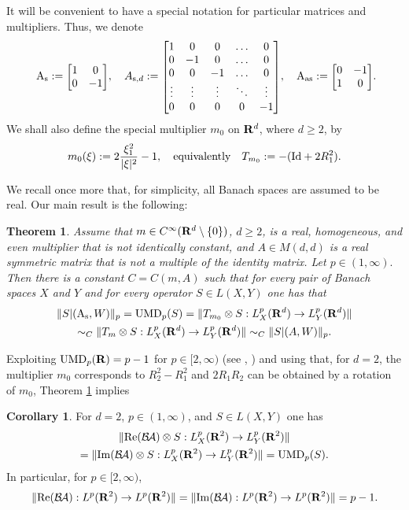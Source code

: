 \documentclass[11pt,a4paper,twoside,draft]{amsart}
\theoremstyle{definition}
\newtheorem{theorem}[lemma]{Theorem}
\newtheorem{corollary}[lemma]{Corollary}
\newcommand{\thm}[1]{\begin{theorem}\label{#1}\sl }
\newcommand{\ethm}{\end{theorem}}
\newcommand{\real}{{\bf R}}
\newcommand{\smooth}{C^\infty}
\newcommand{\BMATRIX}[1]{\begin{bmatrix}#1\end{bmatrix}}
\DeclareMathOperator{\ba}{{\mathcal B\!\mathcal A}}
\DeclareMathOperator{\umd}{{\rm UMD}}
\DeclareMathOperator{\bsym}{{A_{\rm s}}}
\DeclareMathOperator{\basym}{{A_{\rm as}}}
\newcommand{\bsymm}[1]{{A_{{\rm s},#1}}}
\newcommand{\SYM}{{\scriptstyle{\BMATRIX{1&0\\ 0&-1}}}}
\newcommand{\ASYM}{{\scriptstyle\BMATRIX{0&-1\\ 1&0}}}
\begin{document}
It will be convenient to have a special notation for particular matrices and multipliers. 
Thus, we denote 
\begin{equation}\label{eqn:matrices}
 \hspace*{.4em}    
     \bsym := \SYM, 
     \quad 
 \bsymm{d} := {\scriptstyle\BMATRIX{1&0&0& \hdots&0\\ 0&-1&0&\hdots&0\\
              0&0&-1& \hdots&0\\\vdots &\vdots&\vdots&\ddots&\vdots\\0&0&0&0&-1}}, 
     \quad 
    \basym := \ASYM .
\end{equation}
We shall also define the special multiplier $m_0$ on 
$\real^d$, where $d\geq 2$, by
\[
m_0 (\xi ) := 2{\frac{\xi_1^2}{|\xi |^2}} - 1, \quad \mbox{equivalently}\quad 
T_{m_0}    := - ({\rm Id} + 2R_1^2).
\]

We recall once more that, for simplicity, all Banach spaces are assumed to be real.
Our  main result is the following:
\bigskip

\thm{th:3.1}
Assume that $m\in\smooth (\real^d\setminus \{0\})$, $d\ge 2$,  is a real, homogeneous, and 
even multiplier that is not identically constant, and $A\in M(d,d)$ is a real symmetric
matrix that is not a multiple 
of the identity matrix. Let $p\in (1,\infty ).$ Then there is
a constant $C=C(m,A)$ such that for every pair of Banach spaces $X$ and $Y$ and for every 
operator $S\in L(X,Y)$ one has that
\begin{multline*}
      \|  S| ({\bsym} ,W)\|_p
    =  {\rm UMD}_p(S) 
    = \| T_{m_0} \otimes S : L^p_X(\real^d)\to L^p_Y(\real^d) \| \\
   \sim_C \| T_m\otimes S : L^p_X(\real^d)\to L^p_Y(\real^d) \|
   \sim_C  \|  S| (A,W)\|_p.
\end{multline*} 
\ethm 
\bigskip
Exploiting $\umd_p(\real )=p-1$ for $p\in [2,\infty)$ (see \cite{Burk5},
\cite[Theorem 14]{Burk3}) and 
using that, for $d=2$, the multiplier $m_0$  corresponds to $R_2^2-R_1^2$ 
and $2R_1R_2$ can be obtained by a rotation of $m_0$, 
Theorem \ref{th:3.1} implies 
\bigskip

\begin{corollary}\label{cor:3.1} 
For $d=2$, $p\in (1,\infty)$, and $S\in L(X,Y)$ one has
\begin{multline*}
     \| {\rm Re}(\ba) \otimes S : L^p_X(\real^2)\to L^p_Y(\real^2)\| \\
   = \| {\rm Im}(\ba) \otimes S: L^p_X(\real^2)\to L^p_Y(\real^2)\| 
   = {\rm UMD}_p(S).
\end{multline*}
In particular, for $p\in [2,\infty)$,
\[   \| {\rm Re}(\ba): L^p(\real^2)\to L^p(\real^2)\| 
   = \| {\rm Im}(\ba): L^p(\real^2)\to L^p(\real^2)\| 
   = p-1. \]
\end{corollary}
\bigskip 
\end{document}
